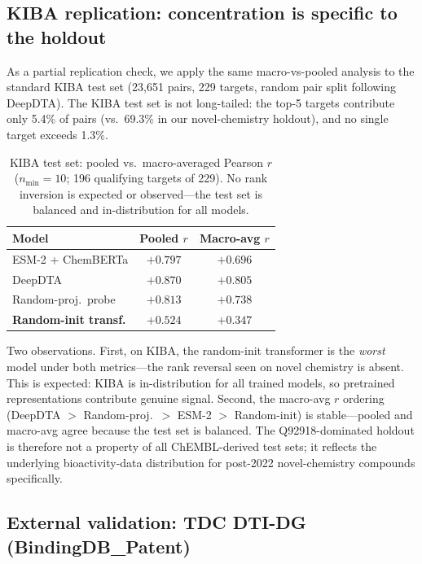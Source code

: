 \documentclass[11pt,a4paper]{article}
\begin{document}
\subsection{KIBA replication: concentration is specific to the holdout}
\label{sec:kiba-replication}

As a partial replication check, we apply the same macro-vs-pooled analysis
to the standard KIBA test set (23{,}651 pairs, 229 targets, random pair split
following DeepDTA).
The KIBA test set is not long-tailed: the top-5 targets contribute only 5.4\%
of pairs (vs.\ 69.3\% in our novel-chemistry holdout), and no single target
exceeds 1.3\%.

\begin{table}[h]
\centering
\caption{KIBA test set: pooled vs.\ macro-averaged Pearson $r$
($n_\text{min} = 10$; 196 qualifying targets of 229).
No rank inversion is expected or observed---the test set is balanced and
in-distribution for all models.}
\label{tab:kiba-replication}
\small
\begin{tabular}{lcc}
\toprule
\textbf{Model} & \textbf{Pooled $r$} & \textbf{Macro-avg $r$} \\
\midrule
ESM-2 + ChemBERTa        & $+0.797$ & $+0.696$ \\
DeepDTA                  & $+0.870$ & $+0.805$ \\
Random-proj.\ probe      & $+0.813$ & $+0.738$ \\
\textbf{Random-init transf.} & $+0.524$ & $+0.347$ \\
\bottomrule
\end{tabular}
\end{table}

Two observations.
First, on KIBA, the random-init transformer is the \emph{worst} model under
both metrics---the rank reversal seen on novel chemistry is absent.
This is expected: KIBA is in-distribution for all trained models, so pretrained
representations contribute genuine signal.
Second, the macro-avg $r$ ordering (DeepDTA $>$ Random-proj.\ $>$ ESM-2 $>$ Random-init)
is stable---pooled and macro-avg agree because the test set is balanced.
The Q92918-dominated holdout is therefore not a property of all
ChEMBL-derived test sets; it reflects the underlying bioactivity-data
distribution for post-2022 novel-chemistry compounds specifically.

\subsection{External validation: TDC DTI-DG (BindingDB\_Patent)}
\label{sec:tdc}
\end{document}
